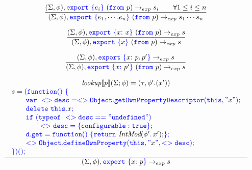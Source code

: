 \documentclass[a4paper]{article}
\newcommand{\code}[1]{\textcolor{blue}{\tt #1}}
\newcommand{\mydot}{.\,}
\newcommand{\lookup}{\emph{lookup}}
\begin{document}
\begin{equation*}
\frac{
    (\Sigma, \phi), \code{export}\ \code{\{} e_i \code{\}}\ (\code{from}\ p) \rightarrow_{exp} s_i \qquad \forall 1 \le i \le n
}{
    (\Sigma, \phi), \code{export}\ \code{\{} e_1 \code{,} \cdots \code{,} e_n \code{\}}\ (\code{from}\ p) \rightarrow_{exp} s_1 \cdots s_n
}
\end{equation*}

\begin{equation*}
\frac{
    (\Sigma, \phi), \code{export}\ \code{\{} x \code{:}\ x \code{\}}\ (\code{from}\ p) \rightarrow_{exp} s
}{
    (\Sigma, \phi), \code{export}\ \code{\{} x \code{\}}\ (\code{from}\ p) \rightarrow_{exp} s
}
\end{equation*}

\begin{equation*}
\frac{
    (\Sigma, \phi), \code{export}\ \code{\{} x \code{:}\ p \code{\mydot} p' \code{\}} \rightarrow_{exp} s
}{
    (\Sigma, \phi), \code{export}\ \code{\{} x \code{:}\ p' \code{\}}\ (\code{from}\ p) \rightarrow_{exp} s
}
\end{equation*}

\begin{equation*}
\frac{
    \begin{array}{c}
    \lookup \llbracket p \rrbracket (\Sigma; \phi) = (\tau, \phi'.(x')) \\
    \begin{array}{l}
    s = \code{(function()}\ \code{\{} \\
    \qquad \code{var\ <>desc = <>Object.getOwnPropertyDescriptor(this, "}x\code{");} \\
    \qquad \code{delete\ this.}x\code{;} \\
    \qquad \code{if\ (typeof\ <>desc == "undefined")} \\
    \qquad\qquad \code{<>desc = \{ configurable: true \};} \\
    \qquad \code{d.get = function()\ \{} \code{return}\ \emph{IntMod} (\phi' \code{\mydot} x') \code{;} \code{\};} \\
    \qquad \code{<>Object.defineOwnProperty(this, "}x\code{", <>desc);} \\
    \code{\})} \code{();} \\
    \end{array}
    \end{array}
}{
    (\Sigma, \phi), \code{export}\ \code{\{} x \code{:}\ p \code{\}} \rightarrow_{exp} s
}
\end{equation*}
\end{document}
